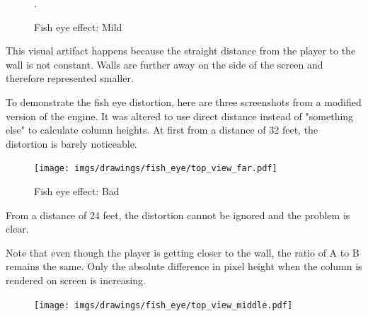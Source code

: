 \begin{minipage}{\textwidth}

    \begin{figure}[H]
    \centering
    \vspace{-10pt}
     \caption{Fish eye effect: Mild}. \label{fig:mips}
     \end{figure} 


    \begin{minipage}{.4\textwidth}
    This visual artifact happens because the straight distance from the player to the wall is not constant. Walls are further away on the side of the screen and therefore represented smaller.\\
    \par
    To demonstrate the fish eye distortion, here are three screenshots from a modified version of the engine. It was altered to use direct distance  instead of "something else" to calculate column heights. At first from a distance of 32 feet, the distortion is barely noticeable.\\
     \end{minipage}
    \begin{minipage}{.6\textwidth}
    \begin{figure}[H]
      \begin{flushright}
     \texttt{[image: imgs/drawings/fish\_eye/top\_view\_far.pdf]}
       \end{flushright}
    \end{figure}
    \end{minipage}
\end{minipage}
\par



\begin{minipage}{\textwidth}
\begin{figure}[H]
\centering
 \caption{Fish eye effect: Bad} \label{fig:mips}
 \end{figure}
\begin{minipage}{.4\textwidth}
From a distance of 24 feet, the distortion cannot be ignored and the problem is clear.\\
\par
Note that even though the player is getting closer to the wall, the ratio of A to B remains the same. Only the absolute difference in pixel height when the column is rendered on screen is increasing.
 \end{minipage}
\begin{minipage}{.6\textwidth}
\begin{figure}[H]
  \begin{flushright}
 \texttt{[image: imgs/drawings/fish\_eye/top\_view\_middle.pdf]}
 \end{flushright}
\end{figure}
\end{minipage}
\end{minipage}




